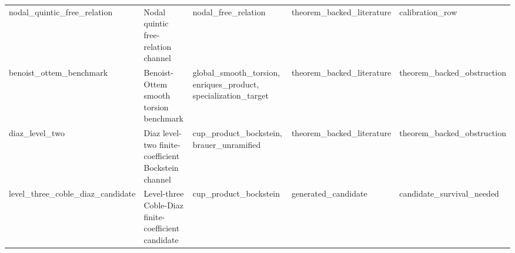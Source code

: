 \begin{table}[h]
\begin{tabular}{|p{}|p{}|p{}|p{}|p{}|}
nodal\_\allowbreak{}quintic\_\allowbreak{}free\_\allowbreak{}relation & Nodal quintic free-relation channel & nodal\_\allowbreak{}free\_\allowbreak{}relation & theorem\_\allowbreak{}backed\_\allowbreak{}literature & calibration\_\allowbreak{}row \\
benoist\_\allowbreak{}ottem\_\allowbreak{}benchmark & Benoist-Ottem smooth torsion benchmark & global\_\allowbreak{}smooth\_\allowbreak{}torsion, enriques\_\allowbreak{}product, specialization\_\allowbreak{}target & theorem\_\allowbreak{}backed\_\allowbreak{}literature & theorem\_\allowbreak{}backed\_\allowbreak{}obstruction \\
diaz\_\allowbreak{}level\_\allowbreak{}two & Diaz level-two finite-coefficient Bockstein channel & cup\_\allowbreak{}product\_\allowbreak{}bockstein, brauer\_\allowbreak{}unramified & theorem\_\allowbreak{}backed\_\allowbreak{}literature & theorem\_\allowbreak{}backed\_\allowbreak{}obstruction \\
level\_\allowbreak{}three\_\allowbreak{}coble\_\allowbreak{}diaz\_\allowbreak{}candidate & Level-three Coble-Diaz finite-coefficient candidate & cup\_\allowbreak{}product\_\allowbreak{}bockstein & generated\_\allowbreak{}candidate & candidate\_\allowbreak{}survival\_\allowbreak{}needed \\
\hline
\end{tabular}
\end{table}
